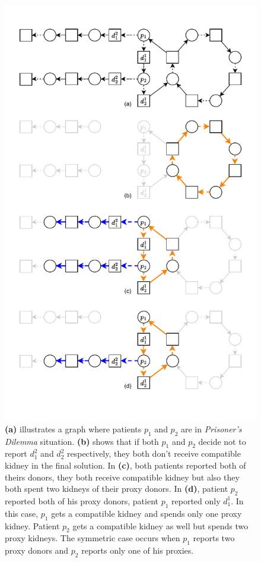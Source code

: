 \begin{figure}
    \centering
    \includegraphics{data/prisoners_dilemma.pdf}
    \caption[Prisoner's dilemma in multiple-donors model]{\textbf{(a)} illustrates a graph where patients $p_1$ and $p_2$ are in \textit{Prisoner's Dilemma} situation. \textbf{(b)} shows that if both $p_1$ and $p_2$ decide not to report $d_1^2$ and $d_2^2$ respectively, they both don't receive compatible kidney in the final solution. In \textbf{(c)}, both patients reported both of theirs donors, they both receive compatible kidney but also they both spent two kidneys of their proxy donors. In \textbf{(d)}, patient $p_2$ reported both of his proxy donors, patient $p_1$ reported only $d_1^1$. In this case, $p_1$ gets a compatible kidney and spends only one proxy kidney. Patient $p_2$ gets a compatible kidney as well but spends two proxy kidneys. The symmetric case occurs when $p_1$ reports two proxy donors and $p_2$ reports only one of his proxies.}
    \label{fig:prisoners_dilemma}
\end{figure}

